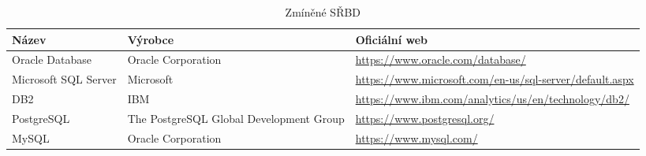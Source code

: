 \documentclass[czech,bachelor,public,dept460,male,oneside]{diploma}
\begin{document}
\begin{table}[h!]
	\centering
	\caption{Zmíněné SŘBD}
	\label{tab:dbms}
	\begin{tabular}{|p{4cm} | p{4cm} | p{6cm} |}
		\hline
		Název & Výrobce & Oficiální web \\
		\hline
		Oracle Database & Oracle Corporation & \url{https://www.oracle.com/database/} \\ \hline
		Microsoft SQL Server & Microsoft & \url{https://www.microsoft.com/en-us/sql-server/default.aspx} \\ \hline
		DB2 & IBM & \url{https://www.ibm.com/analytics/us/en/technology/db2/} \\ \hline
		PostgreSQL & The PostgreSQL Global Development Group & \url{https://www.postgresql.org/} \\ \hline
		MySQL & Oracle Corporation & \url{https://www.mysql.com/} \\
		\hline
	\end{tabular}
\end{table}
\end{document}
